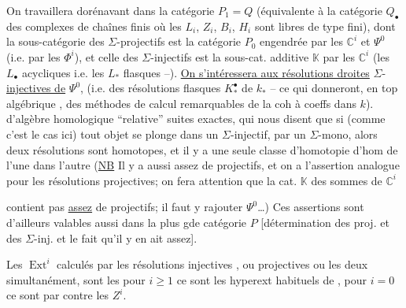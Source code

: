 On travaillera dorénavant dans la catégorie $P_1=Q$ (équivalente à la catégorie $Q_{\bullet}$ des complexes de chaînes finis où les \deleted{\unsure{-}} $L_i$, $Z_i$, $B_i$, $H_i$ sont libres de type fini),  dont la sous-catégorie des $\Sigma$-projectifs est  la catégorie  $P_0$ engendrée par les $\mathbb{C}^i$ et $\Psi^0$ (i.e. par les $\Phi^i$), et celle des $\Sigma$-injectifs est la sous-cat. additive $\mathbb{K}$   par les $\mathbb{C}^i$ (les $L_{\bullet}$  acycliques i.e. les $L_*$ flasques --). \uline{On s'intéressera aux résolutions droites}  $\Sigma$-\uline{injectives de} $\Psi^0$, (i.e. des résolutions flasques $K^{\bullet}_*$ de $k_*$ \unsure{$\simeq$} -- ce qui donneront,  en top algébrique \inserted{\unsure{$\simeq$}}, des méthodes de calcul remarquables de la coh à coeffs dans $k$).  d'algèbre homologique ``relative''  suites exactes, qui nous disent que si (comme c'est le cas ici) tout objet  se plonge dans un $\Sigma$-injectif,  par un $\Sigma$-mono, alors   deux résolutions sont homotopes, et il y a une seule classe d'homotopie d'hom de l'une dans l'autre (\uline{NB} Il y a aussi assez de projectifs, et on a l'assertion analogue pour les résolutions projectives; on fera attention que la cat. $\mathbb{K}$ des sommes de $\mathbb{C}^i$ 

contient pas \uline{assez} de \inserted{$\Sigma$-}projectifs; il faut y rajouter $\Psi^0$\ldots)  Ces  assertions sont d'ailleurs valables aussi dans la plus gde catégorie $P$ [détermination des \inserted{$\Sigma$-}proj. et des $\Sigma$-inj. et le fait qu'il y en ait assez].

Les $\operatorname{Ext}^{i}$ calculés par les résolutions injectives , ou projectives   ou les deux simultanément, sont les  pour $i\geq1$ ce sont les hyperext habituels de , pour $i=0$ ce sont par contre les $Z^i$.

